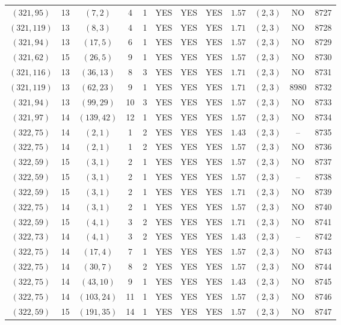 \begin{longtable}{|c|c|c|c|c|c|c|c|c|c|c|c|}
$(321,95)$ & 13 & $(7,2)$ & 4 & 1 & YES & YES & YES & $1.57$ & $(2,3)$ & NO & 8727\\
$(321,119)$ & 13 & $(8,3)$ & 4 & 1 & YES & YES & YES & $1.71$ & $(2,3)$ & NO & 8728\\
$(321,94)$ & 13 & $(17,5)$ & 6 & 1 & YES & YES & YES & $1.57$ & $(2,3)$ & NO & 8729\\
$(321,62)$ & 15 & $(26,5)$ & 9 & 1 & YES & YES & YES & $1.57$ & $(2,3)$ & NO & 8730\\
$(321,116)$ & 13 & $(36,13)$ & 8 & 3 & YES & YES & YES & $1.71$ & $(2,3)$ & NO & 8731\\
$(321,119)$ & 13 & $(62,23)$ & 9 & 1 & YES & YES & YES & $1.71$ & $(2,3)$ & 8980 & 8732\\
$(321,94)$ & 13 & $(99,29)$ & 10 & 3 & YES & YES & YES & $1.57$ & $(2,3)$ & NO & 8733\\
$(321,97)$ & 14 & $(139,42)$ & 12 & 1 & YES & YES & YES & $1.57$ & $(2,3)$ & NO & 8734\\
$(322,75)$ & 14 & $(2,1)$ & 1 & 2 & YES & YES & YES & $1.43$ & $(2,3)$ & -- & 8735\\
$(322,75)$ & 14 & $(2,1)$ & 1 & 2 & YES & YES & YES & $1.57$ & $(2,3)$ & NO & 8736\\
$(322,59)$ & 15 & $(3,1)$ & 2 & 1 & YES & YES & YES & $1.57$ & $(2,3)$ & NO & 8737\\
$(322,59)$ & 15 & $(3,1)$ & 2 & 1 & YES & YES & YES & $1.57$ & $(2,3)$ & -- & 8738\\
$(322,59)$ & 15 & $(3,1)$ & 2 & 1 & YES & YES & YES & $1.71$ & $(2,3)$ & NO & 8739\\
$(322,75)$ & 14 & $(3,1)$ & 2 & 1 & YES & YES & YES & $1.57$ & $(2,3)$ & NO & 8740\\
$(322,59)$ & 15 & $(4,1)$ & 3 & 2 & YES & YES & YES & $1.71$ & $(2,3)$ & NO & 8741\\
$(322,73)$ & 14 & $(4,1)$ & 3 & 2 & YES & YES & YES & $1.43$ & $(2,3)$ & -- & 8742\\
$(322,75)$ & 14 & $(17,4)$ & 7 & 1 & YES & YES & YES & $1.57$ & $(2,3)$ & NO & 8743\\
$(322,75)$ & 14 & $(30,7)$ & 8 & 2 & YES & YES & YES & $1.57$ & $(2,3)$ & NO & 8744\\
$(322,75)$ & 14 & $(43,10)$ & 9 & 1 & YES & YES & YES & $1.43$ & $(2,3)$ & NO & 8745\\
$(322,75)$ & 14 & $(103,24)$ & 11 & 1 & YES & YES & YES & $1.57$ & $(2,3)$ & NO & 8746\\
$(322,59)$ & 15 & $(191,35)$ & 14 & 1 & YES & YES & YES & $1.57$ & $(2,3)$ & NO & 8747\\

\end{longtable}
